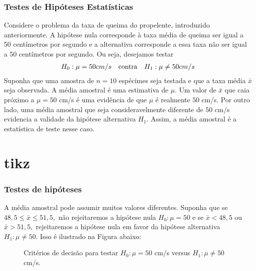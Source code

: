 \documentclass[14pt,aspectratio=1610]{beamer}
\begin{document}
\begin{frame}{}
\frametitle{ Testes de Hipóteses Estatísticas}
\begin{block}{}
\justifying
Considere o problema da taxa de queima do propelente, introduzido anteriormente. A hipótese nula corresponde à taxa média de queima ser igual a 50 centímetros por 
segundo e a alternativa corresponde a essa taxa não ser igual a $50$ centímetros por segundo. Ou seja, desejamos testar
\begin{align*}
\centering
H_{0}: \mu=50 cm/s &&\textrm{contra}&& H_{1}:\mu \neq 50 cm/s
\end{align*}
Suponha que uma amostra de $n = 10$ espécimes seja testada e que a taxa média $\bar{x}$ seja observada. A média amostral é uma estimativa de $\mu.$ Um valor de 
$\bar{x}$ que caia próximo a $\mu = 50$ cm/s é uma evidência de que $\mu$ é realmente $50$ cm/s. Por outro lado, 
uma média amostral que seja consideravelmente diferente de $50$ cm/s evidencia a validade da hipótese alternativa $H_{1}.$ Assim, a média amostral 
é a estatística de teste nesse caso.
\end{block}
\end{frame}

\section{tikz}
\begin{frame}{}
\frametitle{Testes de hipóteses}
\begin{block}{}
\justifying
A média amostral pode assumir muitos valores diferentes. Suponha que se $48,5 \leq \bar{x}\leq 51,5,$ não rejeitaremos a hipótese nula $H_{0}:\mu = 50$ e se 
$\bar{x} < 48,5$ ou $\bar{x} > 51,5,$ rejeitaremos a hipótese nula em favor da hipótese alternativa $H_{1}:\mu \neq 50.$ Isso é ilustrado na Figura abaixo:
 \end{block}\pause
\begin{block}{}
\begin{figure}
\centering
{}
\caption{Critérios de decisão para testar $H_{0}:\mu = 50$ cm/s versus $H_{1}: \mu \neq 50$ cm/s.} \label{fig:M1}
\end{figure}
 \end{block}
\end{frame}
\end{document}
